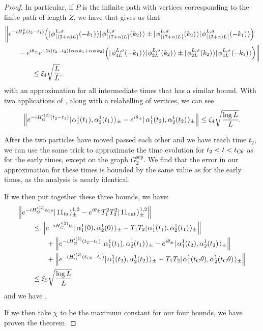 \documentclass[../thesis-main/thesis-main]{subfiles}
\begin{document}
\begin{proof}
In particular, if $P$ is the infinite path with vertices corresponding to the finite path of length $Z$, we have that  gives us that
\begin{align}
  &\bigg \Vert e^{-i H_P^{2}(t_2-t_1)}\Big( |\mspace{2mu} \phi_{\lceil (2+\alpha)L\rceil}^{L,\sigma}(-k_1) \mspace{2mu} \rangle|\mspace{2mu} \phi_{\lceil (7+\alpha)L\rceil}^{L,\sigma}(k_2) \mspace{2mu} \rangle \pm  |\mspace{2mu} \phi_{\lceil (7+\alpha)L\rceil}^{L,\sigma}(k_2) \mspace{2mu} \rangle|\mspace{2mu} \phi_{\lceil (2+\alpha)L\rceil}^{L,\sigma}(-k_1) \mspace{2mu} \rangle\Big)\nonumber\\
  &\qquad - e^{i\theta_{\pm}}e^{-2i (t_2-t_2)(\cos k_1 + \cos k_2)} \Big( |\mspace{2mu} \phi_{4L}^{L,\sigma}(-k_1) \mspace{2mu} \rangle|\mspace{2mu} \phi_{2L}^{L,\sigma}(k_2) \mspace{2mu} \rangle \pm  |\mspace{2mu} \phi_{2L}^{L,\sigma}(k_2) \mspace{2mu} \rangle|\mspace{2mu} \phi_{4L}^{L,\sigma}(-k_1) \mspace{2mu} \rangle\Big)\bigg\Vert\nonumber\\
  &\qquad\qquad \leq \xi_4 \sqrt{\frac{L}{L}},
\end{align}
with an approximation for all intermediate times that has a similar bound.  With two applications of , along with a relabelling of vertices, we can see
\begin{align}
  \Big \Vert e^{-i H_G'^{(2)} (t_2 - t_{1})}|\mspace{2mu} \alpha_1^1(t_1),\alpha_2^1(t_1) \mspace{2mu} \rangle_{\pm} - e^{i\theta_{\pm}}|\mspace{2mu} \alpha_1^1(t_2),\alpha_2^1(t_2) \mspace{2mu} \rangle_{\pm} \Big \Vert  \leq \zeta_4 \sqrt{\frac{\log L}{L}}.
\end{align}


After the two particles have moved passed each other and we have reach time $t_2$, we can use the same trick to approximate the time evolution for $t_2 < t < t_{\mathrm{C}\theta}$ as for the early times, except on the graph $G_2^{\text{sep}}$.  We find that the error in our approximation for these times is bounded by the same value as for the early times, as the analysis is nearly identical.  

If we then put together these three bounds, we have:
\begin{align}
  &\Big\Vert e^{- i H_G'^{(2)} t_{\mathrm{C}\theta}} |\mspace{2mu} 11_{\text{in}} \mspace{2mu} \rangle^{1,2}_{\pm} - e^{i\theta_{\pm}} T_1^2 T_2^2 |\mspace{2mu} 11_{\text{out}} \mspace{2mu} \rangle_{\pm}^{1,2}\Big\Vert\\
  & \qquad \leq \Big \Vert e^{-i H_G'^{(2)} t_{1}} |\mspace{2mu} \alpha_1^1(0),\alpha_2^1(0) \mspace{2mu} \rangle_{\pm}  - T_1T_2|\mspace{2mu} \alpha_1^1(t_1),\alpha_2^1(t_1) \mspace{2mu} \rangle_{\pm} \Big \Vert \nonumber\\
  &\qquad\qquad
  + \Big \Vert e^{-i H_G'^{(2)} (t_2 - t_{1})}|\mspace{2mu} \alpha_1^1(t_1),\alpha_2^1(t_1) \mspace{2mu} \rangle_{\pm} - e^{i\theta_{\pm}}|\mspace{2mu} \alpha_1^1(t_2),\alpha_2^1(t_2) \mspace{2mu} \rangle_{\pm} \Big \Vert \nonumber\\
  &\qquad\qquad
  + \Big \Vert e^{-i H_G'^{(2)} (t_{\mathrm{C}\theta}-t_{2})}|\mspace{2mu} \alpha_1^1(t_2),\alpha_2^1(t_2) \mspace{2mu} \rangle_{\pm} - T_1T_2|\mspace{2mu} \alpha_1^1(t_\mathrm{C}\theta),\alpha_2^1(t_\mathrm{C}\theta) \mspace{2mu} \rangle_{\pm} \Big \Vert\\
  & \qquad \leq\xi_5 \sqrt{\frac{\log L}{L}}
\end{align}
and we have .

If we then take $\chi$ to be the maximum constant for our four bounds, we have proven the theorem.
\end{proof}
\end{document}
